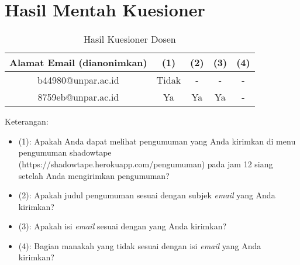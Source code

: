 \section{Hasil Mentah Kuesioner}
\begin{table}[H]
	\caption{Hasil Kuesioner Dosen}
	\label{table:hasil-kuesioner-dosen}
	\centering
	\begin{tabular}{|c|c|c|c|c|}
 			\hline
			\textbf{Alamat Email (dianonimkan)} & \textbf{(1)} & \textbf{(2)} & \textbf{(3)}  & \textbf{(4)} \\
			\hline
			b44980@unpar.ac.id & Tidak & - & - & - \\
			\hline
			8759eb@unpar.ac.id & Ya & Ya & Ya & - \\
            \hline
	\end{tabular}
\end{table}
Keterangan:
\begin{itemize}
\item (1): Apakah Anda dapat melihat pengumuman yang Anda kirimkan di menu pengumuman shadowtape (https://shadowtape.herokuapp.com/pengumuman) pada jam 12 siang setelah Anda mengirimkan pengumuman?
\item (2): Apakah judul pengumuman sesuai dengan subjek \textit{email} yang Anda kirimkan?
\item (3): Apakah isi \textit{email} sesuai dengan yang Anda kirimkan?
\item (4): Bagian manakah yang tidak sesuai dengan isi \textit{email} yang Anda kirimkan?
\end{itemize}

